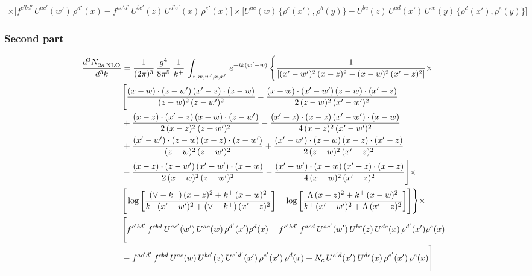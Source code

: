 \documentclass[9pt]{article}
\numberwithin{equation}{section}
\begin{document}
\begin{align}
\times\Bigg[f^{c'bd'}\,U^{ac'}(w')\,\rho^{d'}(x)-f^{ac'd'}\, U^{bc'}(z)\,U^{d'e'}(x)\,\rho^{e'}(x)\Bigg] \times \Bigg[U^{ac}(w)\,\{\rho^{c}(x'),\rho^{b}(y)\}-U^{bc}(z)\,U^{ad}(x')\,U^{ce}(y)\, \{\rho^{d}(x'),\rho^{e}(y)\}\Bigg]
\end{align}
\subsubsection{Second part}
\begin{align} 
    \frac{d^{3}N_{2a\,\rm NLO}^{\rm}}{d^{3}k}  & = \frac{1}{(2\pi)^{3}}\, \frac{g^{4}}{8\pi^{5}}\,\frac{1}{k^{+}}\,\int_{z,w,w^{\prime},x,x'}\, e^{-ik(w^{\prime}-w)}\, \Bigg\{\frac{1}{\left[(x'-w')^{2}\, (x-z)^{2}-(x-w)^{2}\, (x'-z)^{2}\right]}\times\,\notag \\ & \Bigg[\frac{(x-w)\cdot (z-w')\, (x'-z)\cdot (z-w)}{(z-w)^{2}\,(z-w')^{2}}-\frac{(x-w)\cdot (x'-w')\, (z-w)\cdot (x'-z)}{2\, (z-w)^{2}\, (x'-w')^{2}}\notag \\ & + \frac{(x-z)\cdot (x'-z)\, (x-w)\cdot (z-w')}{2\, (x-z)^{2}\, (z-w')^{2}}-\frac{(x'-z)\cdot (x-z)\, (x'-w')\cdot (x-w)}{4\, (x-z)^{2}\, (x'-w')^{2}}\notag \\ & + \frac{(x'-w')\cdot (z-w)\, (x-z)\cdot (z-w')}{(z-w)^{2}\,(z-w')^{2}}+\frac{(x'-w')\cdot (z-w)\, (x-z)\cdot (x'-z)}{2\, (z-w)^{2}\, (x'-z)^{2}}\notag \\ & - \frac{(x-z)\cdot (z-w')\, (x'-w')\cdot (x-w)}{2\, (x-w)^{2}\, (z-w')^{2}} -\frac{(x'-w')\cdot (x-w)\, (x'-z)\cdot (x-z)}{4\, (x-w)^{2}\, (x'-z)^{2}}\Bigg]\times\notag \\ &  \Bigg[\log{\left[\frac{(\vee-k^{+})\,(x-z)^{2}+k^{+}\,(x-w)^{2}}{k^{+}\, (x'-w')^{2} + (\vee-k^{+})\, (x'-z)^{2}}\right]}-\log{\left[\frac{\Lambda\,(x-z)^{2}+k^{+}\,(x-w)^{2}}{k^{+}\, (x'-w')^{2} + \Lambda\, (x'-z)^{2}}\right]}\Bigg] \Bigg\} \times\, \notag \\ & \Bigg[f^{c'bd'}\,f^{cbd}\, U^{ac'}(w')\,U^{ac}(w)\,\rho^{d'}(x')\rho^{d}(x)- f^{c'bd'}\,f^{acd}\,U^{ac'}(w')\,U^{bc}(z)\,U^{de}(x)\,\rho^{d'}(x')\rho^{e}(x) \notag \\ & -f^{ac'd'}\,f^{cbd}\,U^{ac}(w)\,U^{bc'}(z)\,U^{e'd'}(x')\,\rho^{e'}(x')\,\rho^{d}(x) +N_{c}\,U^{e'd}(x')\,U^{de}(x)\,\rho^{e'}(x')\,\rho^{e}(x)\Bigg]
\end{align}
\end{document}
